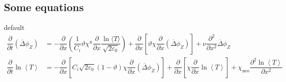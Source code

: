\documentclass[9pt,aspectratio=169]{ctexbeamer}
\begin{document}
\subsection{Some equations}
\begin{frame}{\secname}{\subsecname}
  \begin{tbox}{default}
    \small
    \vspace{-0.3cm}
    \begin{align}
      \dfrac{\partial}{\partial t}\left(\overline{\Delta}\phi_Z\right) & = -\dfrac{\partial}{\partial x}\left(\dfrac{1}{C_i}\vartheta\chi^{\mathrm{n}}\dfrac{\partial}{\partial x}\dfrac{\ln \langle T\rangle}{\sqrt{2\varepsilon_0}}\right) + \dfrac{\partial}{\partial x}\left[ \vartheta\chi \dfrac{\partial}{\partial x}(\overline{\Delta}\phi_Z)\right] + \nu \dfrac{\partial^2}{\partial x^2} \overline{\Delta}\phi_Z\label{E:staircases_Z}\\
      \dfrac{\partial}{\partial t}\ln \left\langle T \right\rangle & = -\dfrac{\partial}{\partial x}\left[C_i \sqrt{2\varepsilon_0} (1-\vartheta) \chi\dfrac{\partial}{\partial x}\left(\overline{\Delta}\phi_Z\right)\right]+\dfrac{\partial}{\partial x}\left[\chi \dfrac{\partial}{\partial x}\ln \left\langle T \right\rangle\right]+\chi_{\mathrm{neo}}\dfrac{\partial^2 \ln \left\langle T \right\rangle}{\partial x^2}\label{E:staircases_T}
    \end{align}
    \vspace{-0.3cm}
  \end{tbox}


\end{frame}
\end{document}

